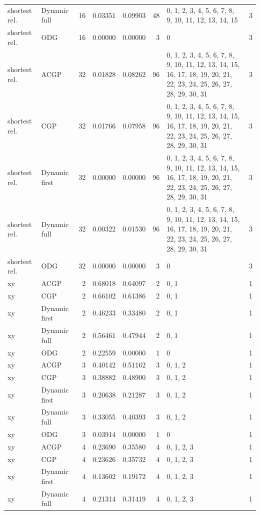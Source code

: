\documentclass[10pt,a4paper]{article}
\begin{document}
\begin{longtable}{@{}p{23mm}p{29mm}rrrrp{36mm}r@{}}
shortest rel. & Dynamic full & 16 & 0.03351 & 0.09903 & 48 & 0, 1, 2, 3, 4, 5, 6, 7, 8, 9, 10, 11, 12, 13, 14, 15 & 3 \\
shortest rel. & ODG & 16 & 0.00000 & 0.00000 & 3 & 0 & 3 \\
shortest rel. & ACGP & 32 & 0.01828 & 0.08262 & 96 & 0, 1, 2, 3, 4, 5, 6, 7, 8, 9, 10, 11, 12, 13, 14, 15, 16, 17, 18, 19, 20, 21, 22, 23, 24, 25, 26, 27, 28, 29, 30, 31 & 3 \\
shortest rel. & CGP & 32 & 0.01766 & 0.07958 & 96 & 0, 1, 2, 3, 4, 5, 6, 7, 8, 9, 10, 11, 12, 13, 14, 15, 16, 17, 18, 19, 20, 21, 22, 23, 24, 25, 26, 27, 28, 29, 30, 31 & 3 \\
shortest rel. & Dynamic first & 32 & 0.00000 & 0.00000 & 96 & 0, 1, 2, 3, 4, 5, 6, 7, 8, 9, 10, 11, 12, 13, 14, 15, 16, 17, 18, 19, 20, 21, 22, 23, 24, 25, 26, 27, 28, 29, 30, 31 & 3 \\
shortest rel. & Dynamic full & 32 & 0.00322 & 0.01530 & 96 & 0, 1, 2, 3, 4, 5, 6, 7, 8, 9, 10, 11, 12, 13, 14, 15, 16, 17, 18, 19, 20, 21, 22, 23, 24, 25, 26, 27, 28, 29, 30, 31 & 3 \\
shortest rel. & ODG & 32 & 0.00000 & 0.00000 & 3 & 0 & 3 \\
xy & ACGP & 2 & 0.68018 & 0.64097 & 2 & 0, 1 & 1 \\
xy & CGP & 2 & 0.66102 & 0.61386 & 2 & 0, 1 & 1 \\
xy & Dynamic first & 2 & 0.46233 & 0.33480 & 2 & 0, 1 & 1 \\
xy & Dynamic full & 2 & 0.56461 & 0.47944 & 2 & 0, 1 & 1 \\
xy & ODG & 2 & 0.22559 & 0.00000 & 1 & 0 & 1 \\
xy & ACGP & 3 & 0.40142 & 0.51162 & 3 & 0, 1, 2 & 1 \\
xy & CGP & 3 & 0.38882 & 0.48900 & 3 & 0, 1, 2 & 1 \\
xy & Dynamic first & 3 & 0.20638 & 0.21287 & 3 & 0, 1, 2 & 1 \\
xy & Dynamic full & 3 & 0.33055 & 0.40393 & 3 & 0, 1, 2 & 1 \\
xy & ODG & 3 & 0.03914 & 0.00000 & 1 & 0 & 1 \\
xy & ACGP & 4 & 0.23690 & 0.35580 & 4 & 0, 1, 2, 3 & 1 \\
xy & CGP & 4 & 0.23626 & 0.35732 & 4 & 0, 1, 2, 3 & 1 \\
xy & Dynamic first & 4 & 0.13602 & 0.19172 & 4 & 0, 1, 2, 3 & 1 \\
xy & Dynamic full & 4 & 0.21314 & 0.31419 & 4 & 0, 1, 2, 3 & 1 \\

\end{longtable}
\end{document}
